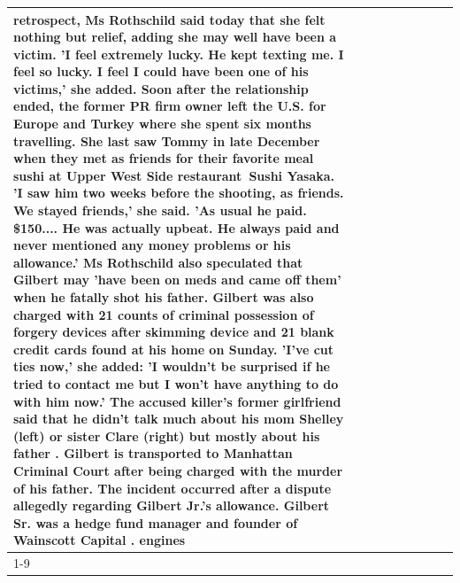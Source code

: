 \begin{table}[H]
\begin{tabular}{lllrlllll}
retrospect, Ms Rothschild said today that she felt nothing but relief, adding she may well have been a victim. 'I feel extremely lucky. He kept texting me. I feel so lucky. I feel I could have been one of his victims,' she added. Soon after the relationship ended, the former PR firm owner left the U.S. for Europe and Turkey where she spent six months  travelling. She last saw Tommy in late December when they met as friends for their favorite meal sushi at Upper West Side restaurant Sushi Yasaka. 'I saw him two weeks before the shooting, as friends. We stayed friends,' she said. 'As usual he paid. \$150.... He was actually upbeat. He always paid and never mentioned any money problems or his allowance.' Ms Rothschild also speculated that Gilbert may 'have been on meds and came off them' when he fatally shot his father. Gilbert was also charged with 21 counts of criminal possession of forgery devices after skimming device and 21 blank credit cards found at his home on Sunday. 'I've cut ties now,' she added: 'I wouldn’t be surprised if he tried to contact me but I won’t have anything to do with him now.' The accused killer's former girlfriend said that he didn't talk much about his mom Shelley (left) or sister Clare (right) but mostly about his father . Gilbert is transported to Manhattan Criminal Court  after being charged with the murder of his father. The incident occurred after a dispute allegedly regarding Gilbert Jr.'s allowance. Gilbert Sr. was a hedge fund manager and founder of Wainscott Capital . engines \\
\cline{1-9}

\end{tabular}
\end{table}
